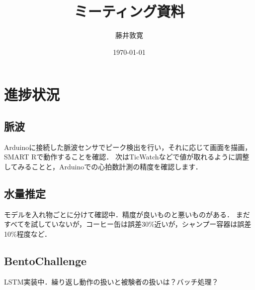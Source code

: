 \documentclass[a4j,10pt]{jarticle}
\title{ミーティング資料}
\author{藤井敦寛}
\date{\today}
\begin{document}
\maketitle

\section{進捗状況}

\subsection{脈波}
Arduinoに接続した脈波センサでピーク検出を行い，それに応じて画面を描画，SMART Rで動作することを確認．
次はTicWatchなどで値が取れるように調整してみることと，Arduinoでの心拍数計測の精度を確認します．

\subsection{水量推定}
モデルを入れ物ごとに分けて確認中．精度が良いものと悪いものがある．
まだすべてを試していないが，コーヒー缶は誤差30\%近いが，シャンプー容器は誤差10\%程度など．

\subsection{BentoChallenge}
LSTM実装中．繰り返し動作の扱いと被験者の扱いは？バッチ処理？




\end{document}
